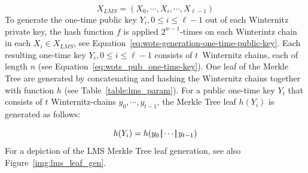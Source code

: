 \begin{equation}
X_{LMS} = (X_0, \cdots, X_i, \cdots, X_{\ell-1})
\end{equation} 
To generate the one-time public key $Y_i, 0 \leq i \leq \ell-1$ out of each Winternitz private key, the hash function $f$ is applied $2^{w-1}$-times on each Winterintz chain in each $X_i \in X_{LMS}$, see Equation~\ref{eq:wots-generation-one-time-public-key}.
Each resulting one-time key $Y_i, 0 \leq i \leq \ell-1$ consists of $t$~Winternitz chains, each of length $n$ (see Equation~\ref{eq:wots_pub_one-time-key}). One leaf of the Merkle Tree are generated by concatenating and hashing the Winternitz chains together with function $h$ (see Table~\ref{table:lms_param}). For a public one-time key $Y_i$ that consists of $t$ Winternitz-chains $y_0, \cdots, y_{t-1}$, the Merkle Tree leaf $h(Y_i)$ is generated as follows:

\begin{equation}
h(Y_i) = h(y_0 \operatorname{|\!\!|} \cdots \operatorname{|\!\!|} y_{t-1})
\end{equation}
For a depiction of the LMS Merkle Tree leaf generation, see also Figure~\ref{img:lms_leaf_gen}.

